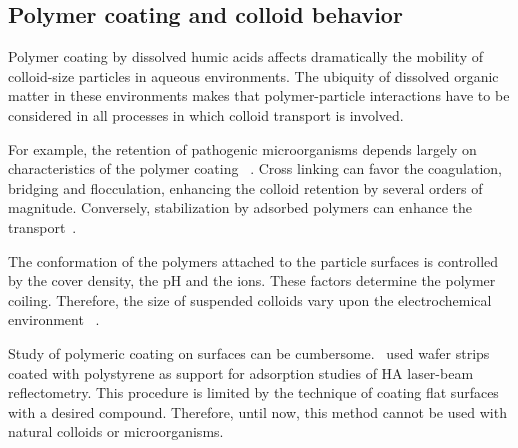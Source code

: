 \documentclass[journal=langd5,manuscript=article]{achemso}
\begin{document}
\subsection{Polymer coating and colloid behavior}

Polymer coating by dissolved humic acids affects dramatically the mobility of colloid-size particles in aqueous environments. The ubiquity of dissolved organic matter in these environments makes that polymer-particle interactions have to be considered in all processes in which colloid transport is involved.

For example, the retention of pathogenic microorganisms depends largely on characteristics of the polymer coating~\cite{Morales2011a} . Cross linking can favor the coagulation, bridging and flocculation, enhancing the colloid retention by several orders of magnitude. Conversely,  stabilization by adsorbed polymers can enhance the transport~\cite{Keller2010}.

The conformation of the polymers attached to the particle surfaces is controlled by the cover density, the pH and the ions. These factors determine the polymer coiling. Therefore, the size of suspended colloids vary upon the electrochemical environment~\cite{Morales2011a} .


Study of polymeric coating   on surfaces can be cumbersome.~\citeauthor{doi:10.1021/es981236u}\cite{doi:10.1021/es981236u}
used   wafer strips coated with  polystyrene as support for
adsorption studies of HA laser-beam reflectometry. This procedure is
limited by the technique of coating flat surfaces with a desired compound. Therefore, until now, this method cannot be used with  natural colloids or microorganisms.



\end{document}
